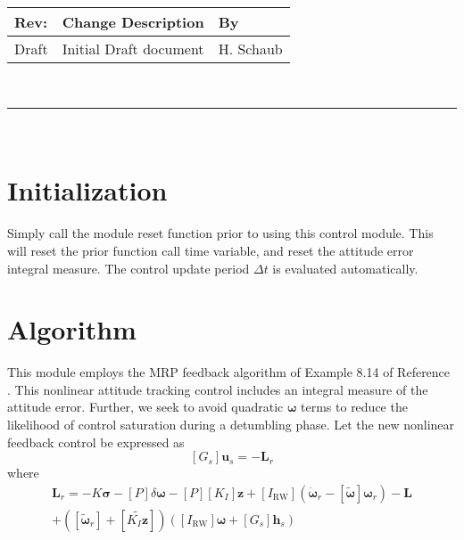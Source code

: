 \documentclass[]{BasiliskReportMemo}
\begin{document}
\makeCover


%
%
\pagestyle{empty}
{\renewcommand{\arraystretch}{2}
\noindent
\begin{longtable}{|p{0.5in}|p{4.5in}|p{1.14in}|}
\hline
{\bfseries Rev}: & {\bfseries Change Description} & {\bfseries By} \\
\hline
Draft & Initial Draft document & H. Schaub \\
\hline

\end{longtable}
}

\newpage
\setcounter{page}{1}
\pagestyle{fancy}

\tableofcontents
~\\ \hrule ~\\


\section{Initialization}
Simply call the module reset function prior to using this control module.  This will reset the prior function call time variable, and reset the attitude error integral measure.  The control update period $\Delta t$ is evaluated automatically.  

\section{Algorithm}
		 This module employs the MRP feedback algorithm of Example 8.14 of Reference .  This  nonlinear attitude tracking control includes an integral measure of the attitude error.  Further, we seek to avoid quadratic $\bm\omega$ terms to reduce the likelihood of control saturation during a detumbling phase.  Let the new nonlinear feedback control be expressed as
		\begin{equation}
			\label{eq:GusRW}
			[G_{s}]\bm u_{s} = -\bm L_{r} 
		\end{equation}
		where
		\begin{multline}
			\label{eq:Lr}
			\bm L_{r} =  -K \bm\sigma - [P] \delta\bm\omega - [P][K_{I}] \bm z  + [I_{\text{RW}}](\dot{\bm\omega}_{r} - [\tilde{\bm\omega}]\bm\omega_{r}) - \bm L
			\\
			+ ([\tilde{\bm \omega}_{r}] + [\widetilde{K_{I}\bm z}])
			\left([I_{\text{RW}}]\bm\omega + [G_{s}]\bm h_{s} \right)
		\end{multline}
\end{document}
